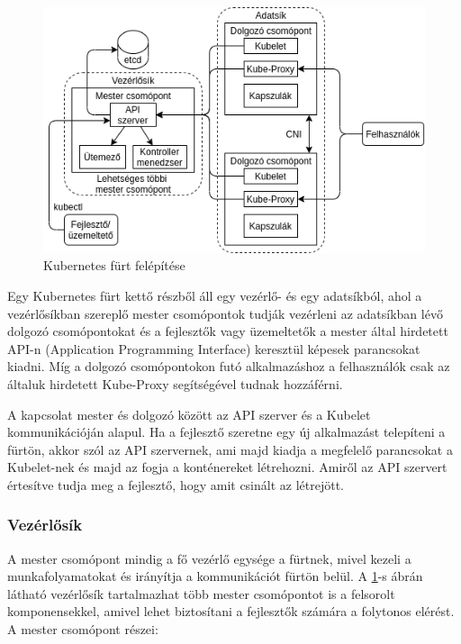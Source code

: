 \begin{figure}[!ht]
	\centering
	\includegraphics[width=1\textwidth, keepaspectratio]{figures/k8s_architecture.png}
	\caption{Kubernetes fürt felépítése}
	\label{fig:achitecture}
\end{figure}

Egy Kubernetes fürt kettő részből áll egy vezérlő- és egy adatsíkból, ahol a 
vezérlősíkban szereplő mester csomópontok tudják vezérleni az adatsíkban 
lévő dolgozó csomópontokat és a fejlesztők vagy üzemeltetők a mester által
hirdetett API-n (Application Programming Interface) keresztül képesek parancsokat
kiadni. Míg a dolgozó csomópontokon futó alkalmazáshoz a felhasználók csak az 
általuk hirdetett Kube-Proxy segítségével tudnak hozzáférni. 

A kapcsolat mester és dolgozó között az API szerver és a Kubelet kommunikációján
alapul. Ha a fejlesztő szeretne egy új alkalmazást telepíteni a fürtön, akkor
szól az API szervernek, ami majd kiadja a megfelelő parancsokat a Kubelet-nek 
és majd az fogja a konténereket létrehozni. Amiről az API szervert értesítve 
tudja meg a fejlesztő, hogy amit csinált az létrejött.

\subsubsection{Vezérlősík}

A mester csomópont mindig a fő vezérlő egysége a fürtnek, mivel kezeli a 
munkafolyamatokat és irányítja a kommunikációt fürtön belül. A \ref{fig:achitecture}-s ábrán
látható vezérlősík tartalmazhat  több mester csomópontot is a felsorolt 
komponensekkel, amivel lehet biztosítani a fejlesztők számára a folytonos 
elérést. A mester csomópont részei: 

